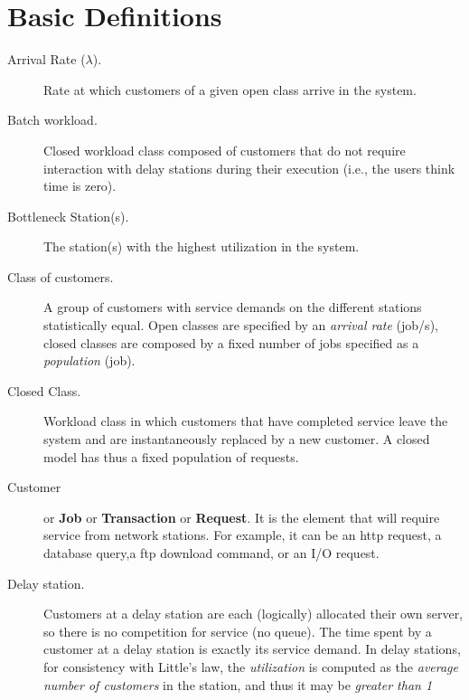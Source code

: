 
%
\chapter{Basic Definitions}
\label{cha:glossary}
\begin{description}
\item[Arrival Rate ($\lambda$).] Rate at which customers of a given open
class arrive in the system.  %
\item[Batch workload.] Closed workload class composed of customers that do not require interaction with delay stations during their execution (i.e., the users think time is zero).
\item[Bottleneck Station(s).] The station(s) with the highest
utilization in the system.
\item[Class of customers.] A group of customers with service
demands on the different stations statistically equal. Open
classes are specified by an \emph{arrival rate} (job/s), closed
classes are composed by a fixed number of jobs specified as a
\emph{population} (job). \item[Closed Class.] Workload class in
which customers that have completed service leave the system and
are instantaneously replaced by a new customer. A closed model has
thus a fixed population of requests. \item[Customer] or
\textbf{Job} or \textbf{Transaction} or \textbf{Request}. It is
the element that will require service from network stations. For
example, it can be an {http request}, a {database query},a {ftp
download command}, or an I/O request. \item[Delay station.]
Customers at a delay station are each (logically) allocated their
own server, so there is no competition for service (no queue). The
time spent by a customer at a delay station is exactly its service
demand. In delay stations, for consistency with Little's law, the
\emph{utilization} is computed as the \emph{average number of
customers} in the station, and thus it may be \emph{greater than
1}


\end{description}
